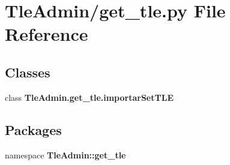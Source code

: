 \section{\-Tle\-Admin/get\-\_\-tle.py \-File \-Reference}
\label{get__tle_8py}
\subsection*{\-Classes}
\begin{DoxyCompactItemize}
\item 
class {\bf \-Tle\-Admin.\-get\-\_\-tle.\-importar\-Set\-T\-L\-E}
\end{DoxyCompactItemize}
\subsection*{\-Packages}
\begin{DoxyCompactItemize}
\item 
namespace {\bf \-Tle\-Admin\-::get\-\_\-tle}
\end{DoxyCompactItemize}
